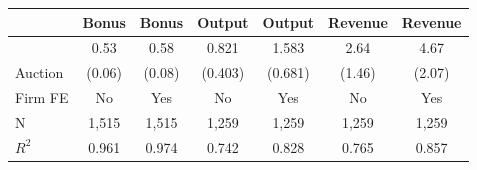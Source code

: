 
\begin{tabular}{lcccccc}
\toprule
 & Bonus & Bonus & Output & Output & Revenue & Revenue\\
\midrule
 & 0.53 & 0.58 & 0.821 & 1.583 & 2.64 & 4.67\\

\multirow{-2}{*}{\raggedright\arraybackslash Auction} & (0.06) & (0.08) & (0.403) & (0.681) & (1.46) & (2.07)\\

\midrule
Firm FE & No & Yes & No & Yes & No & Yes\\

N & 1,515 & 1,515 & 1,259 & 1,259 & 1,259 & 1,259\\

$R^2$ & 0.961 & 0.974 & 0.742 & 0.828 & 0.765 & 0.857\\
\bottomrule
\end{tabular}
